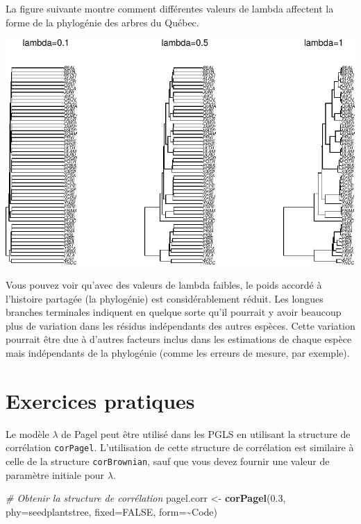 \documentclass[
]{book}
\newenvironment{Shaded}{\begin{snugshade}}{\end{snugshade}}
\newcommand{\AttributeTok}[1]{\textcolor[rgb]{0.13,0.29,0.53}{#1}}
\newcommand{\CommentTok}[1]{\textcolor[rgb]{0.56,0.35,0.01}{\textit{#1}}}
\newcommand{\ConstantTok}[1]{\textcolor[rgb]{0.56,0.35,0.01}{#1}}
\newcommand{\FloatTok}[1]{\textcolor[rgb]{0.00,0.00,0.81}{#1}}
\newcommand{\FunctionTok}[1]{\textcolor[rgb]{0.13,0.29,0.53}{\textbf{#1}}}
\newcommand{\NormalTok}[1]{#1}
\newcommand{\OtherTok}[1]{\textcolor[rgb]{0.56,0.35,0.01}{#1}}
\newcommand{\SpecialCharTok}[1]{\textcolor[rgb]{0.81,0.36,0.00}{\textbf{#1}}}
\begin{document}
La figure suivante montre comment différentes valeurs de lambda affectent la forme de la phylogénie des arbres du Québec.

\begin{center}\includegraphics{pcm-workshop_files/figure-latex/alpha example-1} \end{center}

Vous pouvez voir qu'avec des valeurs de lambda faibles, le poids accordé à l'histoire partagée (la phylogénie) est considérablement réduit. Les longues branches terminales indiquent en quelque sorte qu'il pourrait y avoir beaucoup plus de variation dans les résidus indépendants des autres espèces. Cette variation pourrait être due à d'autres facteurs inclus dans les estimations de chaque espèce mais indépendants de la phylogénie (comme les erreurs de mesure, par exemple).

\section{Exercices pratiques}\label{exercices-pratiques-1}

Le modèle \(\lambda\) de Pagel peut être utilisé dans les PGLS en utilisant la structure de corrélation \texttt{corPagel}. L'utilisation de cette structure de corrélation est similaire à celle de la structure \texttt{corBrownian}, sauf que vous devez fournir une valeur de paramètre initiale pour \(\lambda\).

\begin{Shaded}
\begin{Highlighting}[]
\CommentTok{\# Obtenir la structure de corrélation}
\NormalTok{pagel.corr }\OtherTok{\textless{}{-}} \FunctionTok{corPagel}\NormalTok{(}\FloatTok{0.3}\NormalTok{, }\AttributeTok{phy=}\NormalTok{seedplantstree, }\AttributeTok{fixed=}\ConstantTok{FALSE}\NormalTok{, }\AttributeTok{form=}\SpecialCharTok{\textasciitilde{}}\NormalTok{Code)}
\end{Highlighting}
\end{Shaded}
\end{document}
